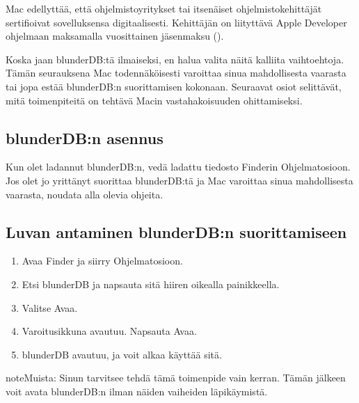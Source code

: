 \documentclass[letterpaper,10pt,finnish]{sphinxmanual}
\begin{document}
\sphinxAtStartPar
Mac edellyttää, että ohjelmistoyritykset tai itsenäiset ohjelmistokehittäjät sertifioivat sovelluksensa digitaalisesti. Kehittäjän on liityttävä Apple Developer \sphinxhyphen{}ohjelmaan maksamalla vuosittainen jäsenmaksu ().

\sphinxAtStartPar
Koska jaan blunderDB:tä ilmaiseksi, en halua valita näitä kalliita vaihtoehtoja. Tämän seurauksena Mac todennäköisesti varoittaa sinua mahdollisesta vaarasta tai jopa estää blunderDB:n suorittamisen kokonaan. Seuraavat osiot selittävät, mitä toimenpiteitä on tehtävä Macin vastahakoisuuden ohittamiseksi.


\subsection{blunderDB:n asennus}
\label{\detokenize{annexe_mac_securite:installation-de-blunderdb}}
\sphinxAtStartPar
Kun olet ladannut blunderDB:n, vedä ladattu tiedosto Finderin Ohjelmat\sphinxhyphen{}osioon. Jos olet jo yrittänyt suorittaa blunderDB:tä ja Mac varoittaa sinua mahdollisesta vaarasta, noudata alla olevia ohjeita.


\subsection{Luvan antaminen blunderDB:n suorittamiseen}
\label{\detokenize{annexe_mac_securite:autorisation-de-l-execution-de-blunderdb}}\begin{enumerate}
%
\item {} 
\sphinxAtStartPar
Avaa Finder ja siirry Ohjelmat\sphinxhyphen{}osioon.

\item {} 
\sphinxAtStartPar
Etsi blunderDB ja napsauta sitä hiiren oikealla painikkeella.

\item {} 
\sphinxAtStartPar
Valitse Avaa.

\item {} 
\sphinxAtStartPar
Varoitusikkuna avautuu. Napsauta Avaa.

\item {} 
\sphinxAtStartPar
blunderDB avautuu, ja voit alkaa käyttää sitä.

\end{enumerate}

\begin{sphinxadmonition}{note}{Muista:}
\sphinxAtStartPar
Sinun tarvitsee tehdä tämä toimenpide vain kerran. Tämän jälkeen voit avata blunderDB:n ilman näiden vaiheiden läpikäymistä.
\end{sphinxadmonition}
\end{document}
